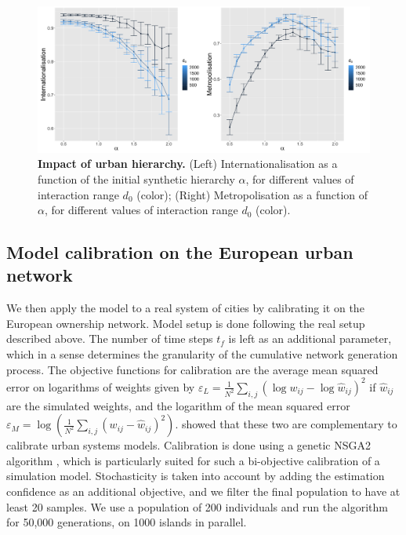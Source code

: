 \documentclass[10pt,letterpaper]{article}
\providecommand{\DIFaddbeginFL}{} %
\providecommand{\DIFaddendFL}{} %
\begin{document}
\begin{figure}
    \DIFaddbeginFL \begin{center}
        \includegraphics[width=\linewidth]{figures/Fig7.png}
    \end{center}
    \DIFaddendFL \vspace{2cm}
    \caption{\textbf{Impact of urban hierarchy.} (Left) Internationalisation as a function of the initial synthetic hierarchy $\alpha$, for different values of interaction range $d_0$ (color); (Right) Metropolisation as a function of $\alpha$, for different values of interaction range $d_0$ (color).\label{fig:fig7}}
\end{figure}



\subsection*{Model calibration on the European urban network}


We then apply the model to a real system of cities by calibrating it on the European ownership network. Model setup is done following the real setup described above. The number of time steps $t_f$ is left as an additional parameter, which in a sense determines the granularity of the cumulative network generation process. The objective functions for calibration are the average mean squared error on logarithms of weights given by $\varepsilon_L = \frac{1}{N^2} \sum_{i,j} \left(\log w_{ij} - \log \hat{w}_{ij} \right)^2$ if $\hat{w}_{ij}$ are the simulated weights, and the logarithm of the mean squared error $\varepsilon_M = \log\left(\frac{1}{N^2} \sum_{i,j} \left(w_{ij} - \hat{w}_{ij}\right)^2 \right)$. \cite{raimbault2018indirect} showed that these two are complementary to calibrate urban systems models. Calibration is done using a genetic NSGA2 algorithm \cite{deb2002fast}, which is particularly suited for such a bi-objective calibration of a simulation model. Stochasticity is taken into account by adding the estimation confidence as an additional objective, and we filter the final population to have at least 20 samples. We use a population of 200 individuals and run the algorithm for 50,000 generations, on 1000 islands in parallel.
\end{document}
